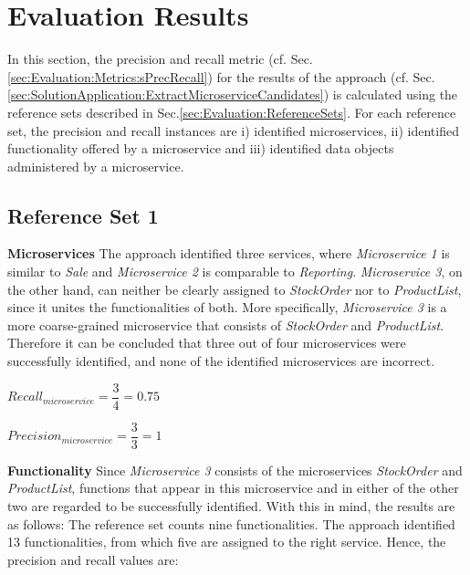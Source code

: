 \section{Evaluation Results}
\label{sec:Evalutation:PrecisionAndRecallMeasurement}
In this section, the precision and recall metric (cf. Sec.\ref{sec:Evaluation:Metrics:sPrecRecall}) for the results of the approach (cf. Sec.\ref{sec:SolutionApplication:ExtractMicroserviceCandidates}) is calculated using the reference sets described in Sec.\ref{sec:Evaluation:ReferenceSets}. 
For each reference set, the precision and recall instances are i) identified microservices, ii) identified functionality offered by a microservice and iii) identified data objects administered by a microservice. 

\subsection{Reference Set 1}

\textbf{Microservices} The approach identified three services, where \textit{Microservice 1} is similar to \textit{Sale} and \textit{Microservice 2} is comparable to \textit{Reporting}. \textit{Microservice 3}, on the other hand, can neither be clearly assigned to \textit{StockOrder} nor to \textit{ProductList}, since it unites the functionalities of both. More specifically, \textit{Microservice 3} is a more coarse-grained microservice that consists of \textit{StockOrder} and \textit{ProductList}. Therefore it can be concluded that three out of four microservices were successfully identified, and none of the identified microservices are incorrect. 

\hspace{1cm}
\noindent
\begin{minipage}{.4\linewidth}
		\vspace{0.5cm}
	\flushleft

		
	$Recall_{microservice}=\dfrac{3}{4} = 0.75  $
		\vspace{0.5cm}
	
\end{minipage}%
\begin{minipage}{.5\linewidth}
	\vspace{0.5cm}
	\flushleft

		
	$Precision_{microservice}=\dfrac{3}{3} = 1  $
		\vspace{0.5cm}
	
\end{minipage}

\noindent
\textbf{Functionality} Since \textit{Microservice 3} consists of the microservices \textit{StockOrder} and \textit{ProductList}, functions that appear in this microservice and in either of the other two are regarded to be successfully identified. With this in mind, the results are as follows: The reference set counts nine functionalities. The approach identified 13 functionalities, from which five are assigned to the right service. Hence, the precision and recall values are:

